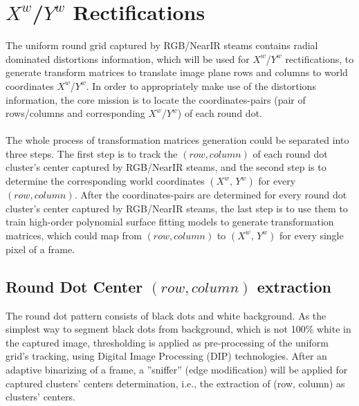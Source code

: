 \section{\(X^{w}\)/\(Y^{w}\) Rectifications}
The uniform round grid captured by RGB/NearIR steams contains radial dominated distortions information, which will be used for \(X^{w}\)/\(Y^{w}\) rectifications, to generate transform matrices to translate image plane rows and columns to world coordinates \(X^{w}\)/\(Y^{w}\). In order to appropriately make use of the distortions information, the core mission is to locate the coordinates-pairs  (pair of rows/columns and corresponding \(X^{w}\)/\(Y^{w}\)) of each round dot. \\\\
%
The whole process of transformation matrices generation could be separated into three steps. %
The first step is to track the \((row, column)\) of each round dot cluster's center captured by RGB/NearIR steams, and the second step is to determine the corresponding world coordinates \((X^w, \,Y^w)\) for every \((row, column)\). After the coordinates-pairs are determined for every round dot cluster's center captured by RGB/NearIR steams, the last step is to use them to train high-order polynomial surface fitting models to generate transformation matrices, which could map from \((row, column)\) to \((X^w, \,Y^w)\) for every single pixel of a frame.
%
\subsection{Round Dot Center \((row, column)\) extraction}
The round dot pattern consists of black dots and white background. As the simplest way to segment black dots from background, which is not 100\% white in the captured image, thresholding is applied as pre-processing of the uniform grid's tracking, using Digital Image Processing (DIP) technologies. After an adaptive binarizing of a frame, a ''sniffer'' (edge modification) will be applied for captured clusters' centers determination, i.e., the extraction of (row, column) as clusters' centers.\par
%
